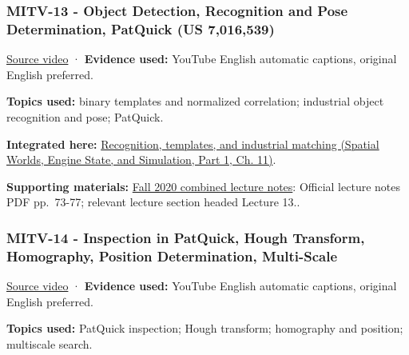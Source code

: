 \subsubsection{MITV-13 - Object Detection, Recognition and Pose Determination, PatQuick (US 7,016,539)}\label{04-visual-computing-ii-ch036-mitv-13---object-detection-recognition-and-pose-determination-patquick-us-7016539}

\hypertarget{04-visual-computing-ii-ch036-mitv-13---object-detection-recognition-and-pose-determination-patquick-us-7016539}{}

\href{https://www.youtube.com/watch?v=lVfm6C51t_Y}{Source video} · \textbf{Evidence used:} YouTube English automatic captions, original English preferred.

\textbf{Topics used:} binary templates and normalized correlation; industrial object recognition and pose; PatQuick.

\textbf{Integrated here:} \href{../05-Spatial-Worlds-Engine-State-and-Simulation-P01/main.pdf\#nameddest=04-visual-computing-ii-ch030-recognition-templates-and-industrial-matching}{Recognition, templates, and industrial matching (Spatial Worlds, Engine State, and Simulation, Part 1, Ch. 11)}.

\textbf{Supporting materials:} \href{https://ocw.mit.edu/courses/6-801-machine-vision-fall-2020/9ec44f69e72995c370b3797818ba01e6_MIT6_801F20_lectureNotes.pdf}{Fall 2020 combined lecture notes}: Official lecture notes PDF pp.~73-77; relevant lecture section headed Lecture 13..

\subsubsection{MITV-14 - Inspection in PatQuick, Hough Transform, Homography, Position Determination, Multi-Scale}\label{04-visual-computing-ii-ch036-mitv-14---inspection-in-patquick-hough-transform-homography-position-determination-multi-scale}

\hypertarget{04-visual-computing-ii-ch036-mitv-14---inspection-in-patquick-hough-transform-homography-position-determination-multi-scale}{}

\href{https://www.youtube.com/watch?v=6SvDRpQeZrA}{Source video} · \textbf{Evidence used:} YouTube English automatic captions, original English preferred.

\textbf{Topics used:} PatQuick inspection; Hough transform; homography and position; multiscale search.

